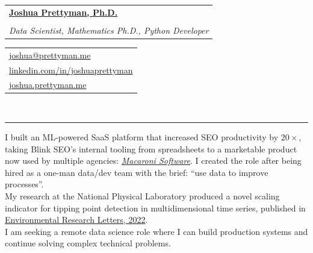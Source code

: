 \documentclass[10pt]{article}
\makeatletter
\newcommand{\makeheading}[8][]{
	\hspace*{-\marginparsep minus \marginparwidth}%
	\begin{minipage}[t]{\textwidth+\marginparwidth+\marginparsep}%
		\begin{tabular}[t]{@{}l}
		{\hspace{-8pt} \Large \bfseries#2}\\
		\\
		{\normalsize \emph{#3}}
		\end{tabular}
		\hfill
		\begin{tabular}[t]{|l}
		#4  \\
		#5  \\
		#6 \\
		
		\end{tabular}
		\vspace{1pt}
		\\[-0.2\baselineskip]%
		
		\rule{\columnwidth}{1pt}%
	\end{minipage}
}
\renewcommand{\section}[1]{
	\pagebreak[3]%
	\hyphenpenalty=10000%
	\vspace{\baselineskip}%
	\phantomsection\addcontentsline{toc}{section}{#1}%
	\noindent{\scshape #1}%
	\vspace{\baselineskip}\par
}
\newenvironment{innerlist}[1][\enskip\textbullet]{
	\begin{itemize}[#1,leftmargin=*,rightmargin=30pt,parsep=0pt,itemsep=1pt,topsep=2pt,partopsep=0pt]
}{\end{itemize}}
\providecommand*\url[1]{\href{#1}{#1}}
\renewcommand*\url[1]{\href{#1}{\texttt{#1}}}
\providecommand*\email[1]{\href{mailto:#1}{#1}}
\makeatother
\begin{document}
\makeheading{
		\href{https://joshua.prettyman.me/}{Joshua Prettyman, Ph.D.}
}
{Data Scientist, Mathematics Ph.D., Python Developer}
{\email{joshua@prettyman.me}}
{\href{https://www.linkedin.com/in/joshuaprettyman/}{linkedin.com/in/joshuaprettyman}}
{\href{https://joshua.prettyman.me/}{joshua.prettyman.me}}







\section{Personal Statement}
I built an ML-powered SaaS platform that increased SEO productivity by $20\times$, taking Blink SEO's internal tooling from spreadsheets to a marketable product now used by multiple agencies: \href{https://www.macaroni.works}{\textit{Macaroni Software}}. I created the role after being hired as a one-man data/dev team with the brief: ``use data to improve processes''. \\
My research at the National Physical Laboratory produced a novel scaling indicator for tipping point detection in multidimensional time series, published in \href{https://doi.org/10.1088/1748-9326/ac526f}{Environmental Research Letters, 2022}.\\
I am seeking a remote data science role where I can build production systems and continue solving complex technical problems.


\end{document}
